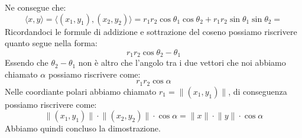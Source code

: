 Ne consegue che:
\begin{equation*}
	\langle x, y \rangle = \langle (x_1, y_1), (x_2, y_2) \rangle = r_1r_2\cos{\theta_1}\cos{\theta_2} + r_1r_2\sin{\theta_1}\sin{\theta_2} =
\end{equation*}
Ricordandoci le formule di addizione e sottrazione del coseno possiamo riscrivere quanto segue nella forma:
\begin{equation*}
	r_1r_2\cos{\theta_2 - \theta_1} 
\end{equation*}
Essendo che $\theta_2 - \theta_1$ non è altro che l'angolo tra i due vettori che noi abbiamo chiamato $\alpha$ possiamo riscrivere come:
\begin{equation*}
	r_1r_2 \cos{\alpha} 
\end{equation*}
Nelle coordiante polari abbiamo chiamato $ r_1 = \lVert (x_1, y_1) \rVert$, di conseguenza possiamo riscrivere come:
\begin{equation*}
	\lVert (x_1, y_1) \rVert \cdot \lVert (x_2, y_2) \rVert \cdot \cos{\alpha} = \lVert x \rVert \cdot \lVert y \rVert \cdot \cos{\alpha}
\end{equation*}
Abbiamo quindi concluso la dimostrazione.


